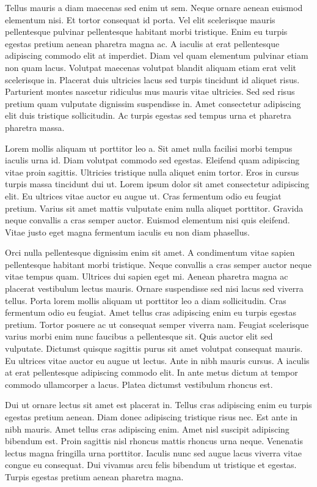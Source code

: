 \documentclass[11pt,a4paper]{article}
\begin{document}
Tellus mauris a diam maecenas sed enim ut sem. Neque ornare aenean euismod elementum nisi. Et tortor consequat id porta. Vel elit scelerisque mauris pellentesque pulvinar pellentesque habitant morbi tristique. Enim eu turpis egestas pretium aenean pharetra magna ac. A iaculis at erat pellentesque adipiscing commodo elit at imperdiet. Diam vel quam elementum pulvinar etiam non quam lacus. Volutpat maecenas volutpat blandit aliquam etiam erat velit scelerisque in. Placerat duis ultricies lacus sed turpis tincidunt id aliquet risus. Parturient montes nascetur ridiculus mus mauris vitae ultricies. Sed sed risus pretium quam vulputate dignissim suspendisse in. Amet consectetur adipiscing elit duis tristique sollicitudin. Ac turpis egestas sed tempus urna et pharetra pharetra massa.

Lorem mollis aliquam ut porttitor leo a. Sit amet nulla facilisi morbi tempus iaculis urna id. Diam volutpat commodo sed egestas. Eleifend quam adipiscing vitae proin sagittis. Ultricies tristique nulla aliquet enim tortor. Eros in cursus turpis massa tincidunt dui ut. Lorem ipsum dolor sit amet consectetur adipiscing elit. Eu ultrices vitae auctor eu augue ut. Cras fermentum odio eu feugiat pretium. Varius sit amet mattis vulputate enim nulla aliquet porttitor. Gravida neque convallis a cras semper auctor. Euismod elementum nisi quis eleifend. Vitae justo eget magna fermentum iaculis eu non diam phasellus.

Orci nulla pellentesque dignissim enim sit amet. A condimentum vitae sapien pellentesque habitant morbi tristique. Neque convallis a cras semper auctor neque vitae tempus quam. Ultrices dui sapien eget mi. Aenean pharetra magna ac placerat vestibulum lectus mauris. Ornare suspendisse sed nisi lacus sed viverra tellus. Porta lorem mollis aliquam ut porttitor leo a diam sollicitudin. Cras fermentum odio eu feugiat. Amet tellus cras adipiscing enim eu turpis egestas pretium. Tortor posuere ac ut consequat semper viverra nam. Feugiat scelerisque varius morbi enim nunc faucibus a pellentesque sit. Quis auctor elit sed vulputate. Dictumst quisque sagittis purus sit amet volutpat consequat mauris. Eu ultrices vitae auctor eu augue ut lectus. Ante in nibh mauris cursus. A iaculis at erat pellentesque adipiscing commodo elit. In ante metus dictum at tempor commodo ullamcorper a lacus. Platea dictumst vestibulum rhoncus est.

Dui ut ornare lectus sit amet est placerat in. Tellus cras adipiscing enim eu turpis egestas pretium aenean. Diam donec adipiscing tristique risus nec. Est ante in nibh mauris. Amet tellus cras adipiscing enim. Amet nisl suscipit adipiscing bibendum est. Proin sagittis nisl rhoncus mattis rhoncus urna neque. Venenatis lectus magna fringilla urna porttitor. Iaculis nunc sed augue lacus viverra vitae congue eu consequat. Dui vivamus arcu felis bibendum ut tristique et egestas. Turpis egestas pretium aenean pharetra magna.
\end{document}
